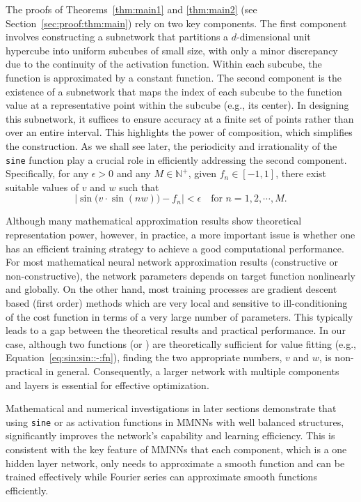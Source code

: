 \documentclass[11pt,a4paper]{article}
\let\dots\cdots
\begin{document}
The proofs of Theorems~\ref{thm:main1} and \ref{thm:main2} (see Section~\ref{sec:proof:thm:main}) rely on two key components. 
The first component involves constructing a subnetwork that partitions a $d$-dimensional unit hypercube into uniform subcubes of small size, with only a minor discrepancy due to the continuity of the activation function. Within each subcube, the function is approximated by a constant function.
The second component is the existence of a subnetwork that maps the index of each subcube to the function value at a representative point within the subcube (e.g., its center). In designing this subnetwork, it suffices to ensure accuracy at a finite set of points rather than over an entire interval. This highlights the power of composition, which simplifies the construction.
As we shall see later, the periodicity and irrationality of the \texttt{sine} function play a crucial role in efficiently addressing the second component. Specifically, for any $\epsilon > 0$ and any $M \in \mathbb{N}^+$, given $f_n \in [-1,1]$, there exist suitable values of $v$ and $w$ such that
\begin{equation}
\label{eq:sin:sin::-:fn}
    \left| \sin \big( v\cdot \sin (n w) \big) - f_n \right| < \epsilon  \quad \text{for } n = 1, 2, \dots, M.
\end{equation}

Although many mathematical approximation results show theoretical representation power, however, in practice, a more important issue is whether one has an efficient training strategy to achieve a good computational performance. For most mathematical neural network approximation results (constructive or non-constructive), the network parameters depends on target function nonlinearly and globally. On the other hand, most training processes are gradient descent based (first order) methods which are very local and sensitive to ill-conditioning of the cost function in terms of a very large number of parameters. This typically leads to a gap between the theoretical results and practical performance. In our case, although two \sine{} functions (or ) are theoretically sufficient for value fitting (e.g., Equation~\eqref{eq:sin:sin::-:fn}), finding the two appropriate numbers, $v$ and $w$, is non-practical in general. Consequently, a larger network with multiple components and layers is essential for effective optimization.

Mathematical and numerical investigations in later sections demonstrate that using \texttt{sine} or  as activation functions in MMNNs with well balanced structures, significantly improves the network’s capability and learning efficiency. This is consistent with the key feature of MMNNs that each component, which is a one hidden layer network, only needs to approximate a smooth function and can be trained effectively while Fourier series can approximate smooth functions efficiently.
\end{document}
